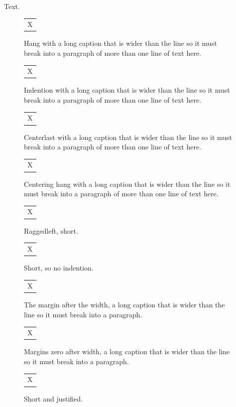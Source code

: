 \documentclass{article}
\begin{document}
Text.
\begin{figure}[h]
\centering
\begin{tabular}{c}X\end{tabular}
\caption{Hang with a long caption that is wider than the line so it must break into a paragraph of more than one line of text here.}
\end{figure}
\begin{figure}[h]
\begin{tabular}{c}X\end{tabular}
\caption{Indention with a long caption that is wider than the line so it must break into a paragraph of more than one line of text here.}
\end{figure}
\begin{figure}[h]
\captionsetup{justification=centerlast,width=.7\linewidth}
\begin{tabular}{c}X\end{tabular}
\caption{Centerlast with a long caption that is wider than the line so it must break into a paragraph of more than one line of text here.}
\end{figure}
\begin{figure}[h]
\captionsetup{justification=centering,format=hang,margin=0pt}
\begin{tabular}{c}X\end{tabular}
\caption{Centering hang with a long caption that is wider than the line so it must break into a paragraph of more than one line of text here.}
\end{figure}
\begin{figure}[h]
\captionsetup{justification=raggedleft,singlelinecheck=false}
\begin{tabular}{c}X\end{tabular}
\caption{Raggedleft, short.}
\end{figure}
\begin{figure}[h]
\captionsetup{indention=3em}
\begin{tabular}{c}X\end{tabular}
\caption{Short, so no indention.}
\end{figure}
\begin{figure}[h]
\captionsetup{width=.5\linewidth,margin=30pt}
\begin{tabular}{c}X\end{tabular}
\caption{The margin after the width, a long caption that is wider than the line so it must break into a paragraph.}
\end{figure}
\begin{figure}[h]
\captionsetup{margin=40pt,width=0pt,format=plain}
\begin{tabular}{c}X\end{tabular}
\caption{Margins zero after width, a long caption that is wider than the line so it must break into a paragraph.}
\end{figure}
\begin{figure}[h]
\captionsetup{singlelinecheck=off,format=plain}
\begin{tabular}{c}X\end{tabular}
\caption{Short and justified.}
\end{figure}
\end{document}
